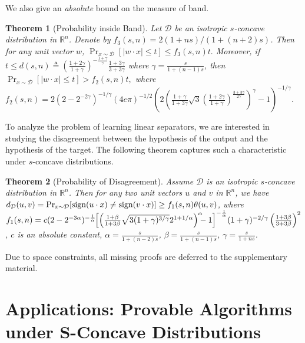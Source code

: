 \documentclass[11pt]{article}
\newcommand{\R}{\mathbb{R}}
\newcommand{\red}[1]{{\color{black}#1}}
\newcommand{\sign}{\textup{sign}}
\newtheorem{theorem}{Theorem}
\begin{document}
We also give an \emph{absolute} bound on the measure of band.
\begin{theorem}[Probability inside Band]
\label{theorem: probability within margin}
Let $\mathcal{D}$ be an isotropic $s$-concave distribution in $\R^n$. Denote by $f_3(s,n)=2(1+ns)/(1+(n+2)s)$. Then for any unit vector $w$,
$
\Pr_{x\sim\mathcal{D}}[|w\cdot x|\le t]\le f_3(s,n)t.
$
Moreover, if $t\le d(s,n)\triangleq\left(\frac{1+2\gamma}{1+\gamma}\right)^{-\frac{1+\gamma}{\gamma}}\frac{1+3\gamma}{3+3\gamma}$ where $\gamma=\frac{s}{1+(n-1)s}$, then
$
\Pr_{x\sim\mathcal{D}}[|w\cdot x|\le t]> f_2(s,n)t,
$
where $f_2(s,n)=2(2-2^{-2\gamma})^{-1/\gamma}(4e\pi)^{-1/2}\left(2\left(\frac{1+\gamma}{1+3\gamma}\sqrt{3}\left(\frac{1+2\gamma}{1+\gamma}\right)^{\frac{3+3\gamma}{2\gamma}}\right)^\gamma-1\right)^{-1/\gamma}$.
\end{theorem}




To analyze the problem of learning linear separators, we are interested in studying the disagreement between the hypothesis of the output and the hypothesis of the target. The following theorem captures such a characteristic under $s$-concave distributions.

\begin{theorem}[Probability of Disagreement]
\label{theorem: disagreement and angle}
Assume $\mathcal{D}$ is an isotropic $s$-concave distribution in $\R^n$. Then for any two unit vectors $u$ and $v$ in $\R^n$, we have $d_\mathcal{D}(u,v)=\Pr_{x\sim\mathcal{D}}[\sign(u\cdot x)\not=\sign(v\cdot x)]\ge f_1(s,n)\theta(u,v)$, where $f_1(s,n)=c\red{(2-2^{-3\alpha})^{-\frac{1}{\alpha}}\hspace{-0.1cm}\left[\left(\frac{1+\beta}{1+3\beta}\sqrt{3(1+\gamma)^{3/\gamma}}2^{1+1/\alpha}\right)^{\alpha}\hspace{-0.2cm}-1\right]^{-\frac{1}{\alpha}}}(1+\gamma)^{-2/\gamma}\left(\frac{1+3\beta}{3+3\beta}\right)^2$, $c$ is an absolute constant, $\alpha=\frac{s}{1+(n-2)s}$, $\beta=\frac{s}{1+(n-1)s}$, $\gamma=\frac{s}{1+ns}$.
\end{theorem}

Due to space constraints, all missing proofs are deferred to the supplementary material.






\section{Applications: Provable Algorithms under S-Concave Distributions}
\end{document}
